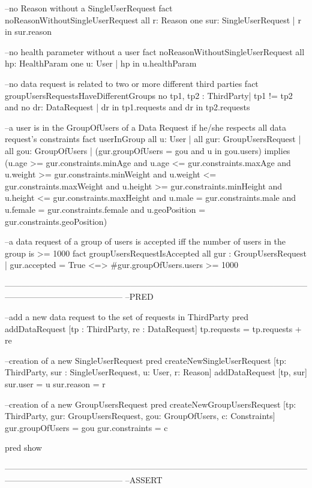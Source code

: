 --no Reason without a SingleUserRequest
fact noReasonWithoutSingleUserRequest{
	all r: Reason {one sur: SingleUserRequest | r in sur.reason}
}

--no health parameter without a user
fact noReasonWithoutSingleUserRequest{
	all hp: HealthParam {one u: User | hp in u.healthParam}
}

--no data request is related to two or more different third parties
fact groupUsersRequestsHaveDifferentGroups{
	no tp1, tp2 : ThirdParty| tp1 != tp2 and { no dr:  DataRequest | dr in tp1.requests and dr in tp2.requests}
}

--a user is in the GroupOfUsers of a Data Request if he/she respects all data request's constraints
fact userInGroup{
	all u: User | all gur: GroupUsersRequest | all gou: GroupOfUsers |  (gur.groupOfUsers = gou and u in gou.users)  implies 
	(u.age >= gur.constraints.minAge and u.age <= gur.constraints.maxAge and u.weight >= gur.constraints.minWeight
	and u.weight <= gur.constraints.maxWeight and u.height >= gur.constraints.minHeight and u.height <= gur.constraints.maxHeight
	and u.male = gur.constraints.male and u.female = gur.constraints.female and u.geoPosition = gur.constraints.geoPosition)
}

--a data request of a group of users is accepted iff the number of users in the group is >= 1000
fact groupUsersRequestIsAccepted{
	all gur :  GroupUsersRequest | gur.accepted = True <=> #gur.groupOfUsers.users >= 1000
}

------------------------------------------------------------------------------------------------------------------------------------------------------
--PRED

--add a new data request to the set of requests in ThirdParty	
pred addDataRequest [tp : ThirdParty, re : DataRequest]{
	tp.requests = tp.requests + re
}

--creation of a new SingleUserRequest
pred createNewSingleUserRequest [tp: ThirdParty, sur : SingleUserRequest, u: User, r: Reason]{
	addDataRequest [tp, sur]
	sur.user = u
	sur.reason = r
}

--creation of a new GroupUsersRequest
pred createNewGroupUsersRequest [tp: ThirdParty, gur: GroupUsersRequest, gou: GroupOfUsers,  c: Constraints]{
	gur.groupOfUsers = gou
	gur.constraints = c
}

pred show {}

------------------------------------------------------------------------------------------------------------------------------------------------------
--ASSERT

